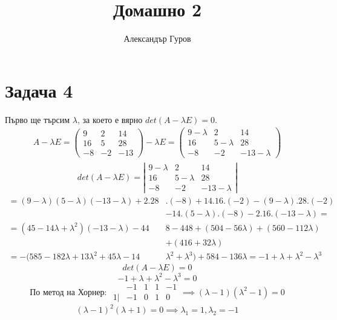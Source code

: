 \documentclass{article}
\title{Домашно 2}
\author{Александър Гуров}
\date{\datebulgarian{\today}}
\begin{document}
\maketitle
\section*{Задача 4}

Първо ще търсим $\lambda$, за което е вярно $det(A-\lambda E)=0$.
\begin{align*}
    A-\lambda E=
    \left(
    \begin{array}{ccc}
        9  & 2  & 14  \\
        16 & 5  & 28  \\
        -8 & -2 & -13
    \end{array}
    \right)
    -\lambda E=
    \left(\begin{array}{ccc}
              9-\lambda & 2         & 14          \\
              16        & 5-\lambda & 28          \\
              -8        & -2        & -13-\lambda
          \end{array}
    \right)
\end{align*}
\begin{align*}
    det(A-\lambda E)=
    \left|\begin{array}{ccc}
              9-\lambda & 2         & 14          \\
              16        & 5-\lambda & 28          \\
              -8        & -2        & -13-\lambda
          \end{array}
    \right|
\end{align*}
\begin{align*}
    =(9-\lambda)(5-\lambda)(-13-\lambda)+2.28  & .(-8)  +14.16.(-2)-(9-\lambda).28.(-2)                                \\
                                               & -14.(5-\lambda).(-8)-2.16.(-13-\lambda)=                              \\
    =(45-14\lambda+\lambda^2)(-13-\lambda)-44  & 8  -448+(504-56\lambda)+(560-112\lambda)                              \\
                                               & +(416+32\lambda)                                                      \\
    =-(585-182\lambda+13\lambda^2+45\lambda-14 & \lambda^2+\lambda^3)  + 584-136\lambda=-1+\lambda+\lambda^2-\lambda^3
\end{align*}
\[
    det(A-\lambda E)=0
\]
\[
    -1+\lambda+\lambda^2-\lambda^3=0
\]
\[
    \text{По метод на Хорнер: }
    \begin{array}{ccccc}
           & -1 & 1 & 1 & -1 \\
        1| & -1 & 0 & 1 & 0
    \end{array}
    \implies(\lambda -1)(\lambda ^2-1)=0
\]
\[
    (\lambda -1)^2(\lambda +1)=0 \implies \lambda_1=1, \lambda_2=-1
\]
\end{document}
